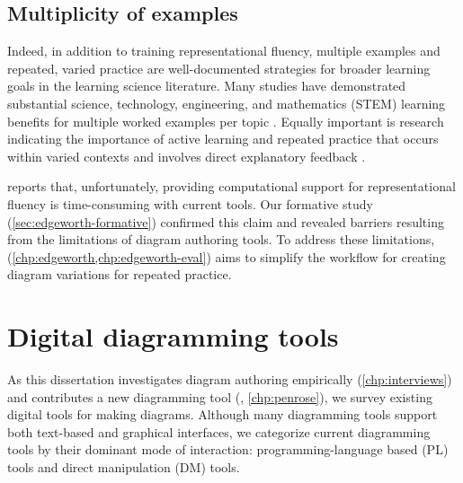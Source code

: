 \subsection{Multiplicity of examples}

Indeed, in addition to training representational fluency, multiple examples and repeated, varied practice are well-documented strategies for broader learning goals in the learning science literature. Many studies have demonstrated substantial science, technology, engineering, and mathematics (STEM) learning benefits for multiple worked examples per topic \cite{pashler_organizing_2007}. Equally important is research indicating the importance of active learning \cite{chi_icap_2014,deslauriers_measuring_2019} and repeated practice \cite{deliberatePractice,schnackenberg_learner_1998} that occurs within varied contexts \cite{PV94,rohrer_shuffling_2007} and involves direct explanatory feedback \cite{kellman_perceptual_2010}.

\citet{rau_conditions_2017} reports that, unfortunately, providing computational support for representational fluency is time-consuming with current tools. Our formative study (\cref{sec:edgeworth-formative}) confirmed this claim and revealed barriers resulting from the limitations of diagram authoring tools. To address these limitations, \Edgeworth (\cref{chp:edgeworth,chp:edgeworth-eval}) aims to simplify the workflow for creating diagram variations for repeated practice. 


\section{Digital diagramming tools}
\label{sec:related-systems}

As this dissertation investigates diagram authoring empirically (\cref{chp:interviews}) and contributes a new diagramming tool (\Penrose, \cref{chp:penrose}), we survey existing digital tools for making diagrams. Although many diagramming tools support both text-based and graphical interfaces, we categorize current diagramming tools by their dominant mode of interaction: programming-language based (PL) tools and direct manipulation (DM) tools. 

